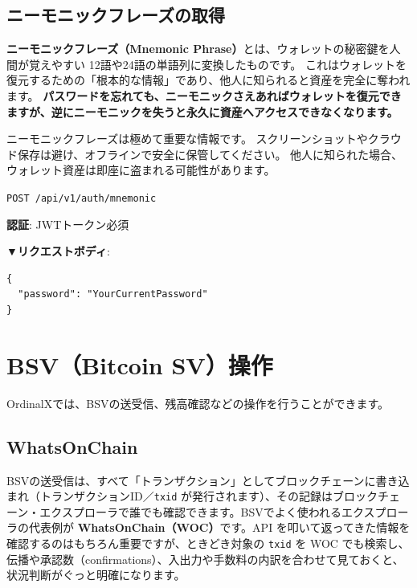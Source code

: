 \documentclass[11pt,a4paper]{ltjsarticle}  %
\begin{document}
\subsection{ニーモニックフレーズの取得}
\textbf{ニーモニックフレーズ（Mnemonic Phrase）}とは、ウォレットの秘密鍵を人間が覚えやすい
12語や24語の単語列に変換したものです。  
これはウォレットを復元するための「根本的な情報」であり、他人に知られると資産を完全に奪われます。  
\textbf{パスワードを忘れても、ニーモニックさえあればウォレットを復元できますが、逆にニーモニックを失うと永久に資産へアクセスできなくなります。}

\begin{tcolorbox}[colback=red!10,colframe=red!50!black,title=セキュリティ警告]
ニーモニックフレーズは極めて重要な情報です。  
スクリーンショットやクラウド保存は避け、オフラインで安全に保管してください。  
他人に知られた場合、ウォレット資産は即座に盗まれる可能性があります。
\end{tcolorbox}

\begin{tcolorbox}[colback=blue!5,colframe=blue!50!black,title=エンドポイント]
\texttt{POST /api/v1/auth/mnemonic}
\end{tcolorbox}


\textbf{認証}: JWTトークン必須


\textbf{▼リクエストボディ}:
\begin{lstlisting}[style=json]
{
  "password": "YourCurrentPassword"
}
\end{lstlisting}

\section{BSV（Bitcoin SV）操作}

OrdinalXでは、BSVの送受信、残高確認などの操作を行うことができます。

\subsection{WhatsOnChain}
BSVの送受信は、すべて「トランザクション」としてブロックチェーンに書き込まれ（トランザクションID／\texttt{txid} が発行されます）、その記録はブロックチェーン・エクスプローラで誰でも確認できます。BSVでよく使われるエクスプローラの代表例が \textbf{WhatsOnChain（WOC）}です。API を叩いて返ってきた情報を確認するのはもちろん重要ですが、ときどき対象の \texttt{txid} を WOC でも検索し、伝播や承認数（confirmations）、入出力や手数料の内訳を合わせて見ておくと、状況判断がぐっと明確になります。
\end{document}
